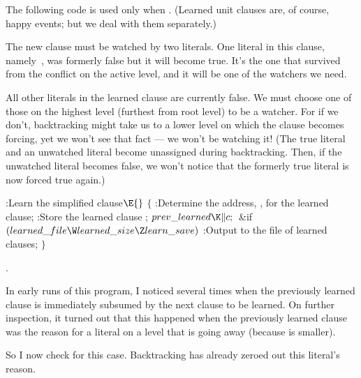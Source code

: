 The following code is used only when . (Learned
unit clauses are, of course, happy events; but we deal with them separately.)

The new clause must be watched by two literals. One literal in this
clause, namely~, was formerly false but it will become true.
It's the one that survived from the conflict
on the active level, and it will be one of the watchers we need.

All other literals in the learned clause are currently false. We must
choose one of those on the highest level (furthest from root level)
to be a watcher. For if we don't, backtracking might take us to
a lower level on which the clause becomes forcing, yet we won't
see that fact --- we won't be watching it! (The true literal and
an unwatched literal become unassigned during backtracking.
Then, if the unwatched literal
becomes false, we won't notice that the formerly true literal
is now forced true again.)

\Y\B\4:Learn the simplified clause\X${}\E{}$\6
${}\{{}$\1\6
:Determine the address, , for the learned clause\X;\6
:Store the learned clause \X;\6
${}\\{prev\_learned}\K\|c;{}$\6
\&{if} ${}(\\{learned\_file}\W\\{learned\_size}\Z\\{learn\_save}){}$\1\5
:Output  to the file of learned clauses\X;\2\6
\4${}\}{}$\2\par
{}.\fi

In early runs of this program, I noticed several times
when the previously
learned clause is immediately subsumed by the next clause to be learned.
On further inspection, it turned out that this happened when the
previously learned clause was the reason for a literal on a level that
is going away (because  is smaller).

So I now check for this case. Backtracking has already zeroed out this
literal's reason.

